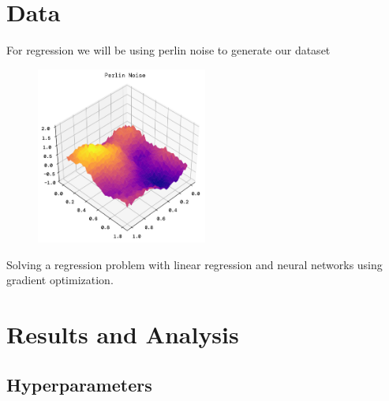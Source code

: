 \documentclass[twoside,11pt]{report}
\begin{document}
\section*{Data}

For regression we will be using perlin noise to generate our dataset 

\begin{figure}
    \begin{center}
        \includegraphics[width=0.5\textwidth]{../runsAndFigures/perlinNoise.png}
    \end{center}
    \caption{}\label{fig:perlin}
\end{figure}

Solving a regression problem with linear regression and neural networks using gradient optimization.



\section*{Results and Analysis}
\label{sec:resultsdiscussion2}




\subsection*{Hyperparameters}
\label{sec:hyperparameters2}
\end{document}
